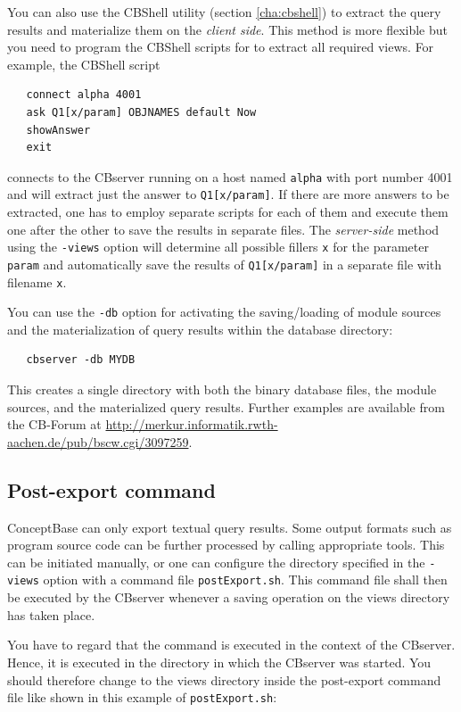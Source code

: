 You can also use the CBShell utility (section \ref{cha:cbshell}) to extract
the query results and materialize them on the {\em client side}. This method
is more flexible but you need to program the CBShell scripts for
to extract all required views. For example, the CBShell script

\begin{verbatim}
   connect alpha 4001 
   ask Q1[x/param] OBJNAMES default Now
   showAnswer
   exit
\end{verbatim}

connects to the CBserver running on a host named {\tt alpha} with port number
4001 and will extract just the answer to {\tt Q1[x/param]}. If there are more answers to
be extracted, one has to employ separate scripts for each of them and execute them
one after the other to save the results in separate files.
The {\em server-side\/} method using the {\tt -views} option will determine
all possible fillers {\tt x} for the parameter {\tt param} and automatically save
the results of {\tt Q1[x/param]} in a separate file with filename {\tt x}.

You can use the {\tt -db} option for activating the saving/loading of module sources
and the materialization of query results within the database directory:

\begin{verbatim}
   cbserver -db MYDB 
\end{verbatim}

This creates a single directory with both the binary database files, the module sources,
and the materialized query results.
Further examples are available from the CB-Forum at \url{http://merkur.informatik.rwth-aachen.de/pub/bscw.cgi/3097259}.


\subsection{Post-export command}

ConceptBase can only export textual query results. Some output formats such as
program source code can be further processed by calling appropriate tools.
This can be initiated manually, or one can configure the directory specified
in the {\tt -views} option with a command file  {\tt postExport.sh}.
This command file shall then be executed
by the CBserver whenever a saving operation on the views directory has taken place.

You have to regard that the command is executed in the context of the CBserver.
Hence, it is executed in the directory in which the CBserver was started.
You should therefore change to the views directory inside the post-export
command file like shown in this example of {\tt postExport.sh}:


